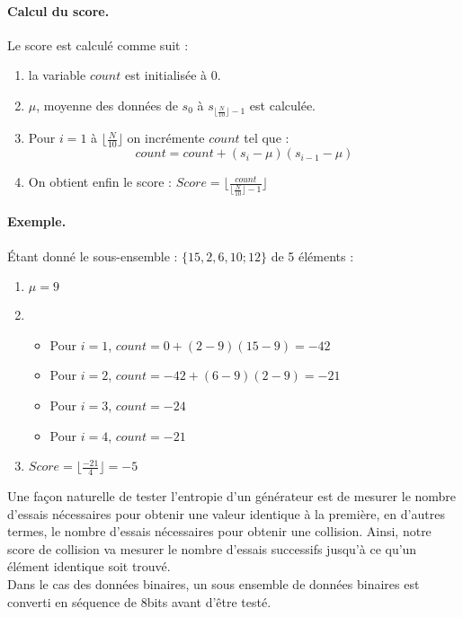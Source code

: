 \paragraph{Calcul du score.\\}
Le score est calculé comme suit : 
\begin{enumerate}
\item la variable $count$ est initialisée à 0.
\item $\mu$, moyenne des données de $s_0$ à $s_{\lfloor\frac{N}{10}\rfloor-1}$ est calculée.
\item Pour $i=1$ à $\lfloor\frac{N}{10}\rfloor$ on incrémente $count$ tel que :
$$count = count + (s_i - \mu)(s_{i-1} - \mu)$$
\item On obtient enfin le score : $Score = \lfloor \frac{count}{\lfloor\frac{N}{10}\rfloor-1} \rfloor$
\end{enumerate}

\paragraph{Exemple.\\}
Étant donné le sous-ensemble  : $\lbrace 15, 2 ,6 , 10; 12 \rbrace$ de 5 éléments :
\begin{enumerate}
\item $\mu = 9$
\item 	\begin{itemize}
		\item Pour $i=1$, $count =0 + (2-9)(15-9) = -42$
		\item Pour $i=2$, $count = -42 + (6-9)(2-9) = -21$
		\item Pour $i=3$, $count = -24$
		\item Pour $i=4$, $count = -21$
		\end{itemize}
\item $Score = \lfloor \frac{-21}{4} \rfloor = -5$
\end{enumerate}

Une façon naturelle de tester l'entropie d'un générateur est de mesurer le nombre d'essais nécessaires pour obtenir une valeur identique à la première, en d'autres termes, le nombre d'essais nécessaires pour obtenir une collision. Ainsi,  notre score de collision va mesurer le nombre d'essais successifs jusqu'à ce qu'un élément identique soit trouvé.\\


Dans le cas des données binaires, un sous ensemble de données binaires est converti en séquence de 8bits avant d'être testé. \\

